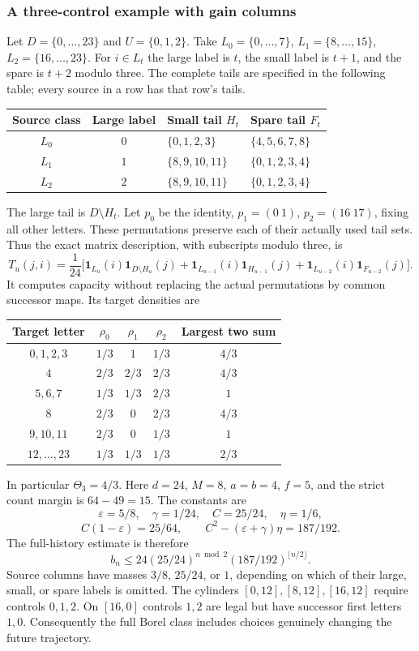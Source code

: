 \documentclass[11pt,reqno]{amsart}
\numberwithin{equation}{section}
\theoremstyle{definition}
\theoremstyle{definition}
\newcommand{\one}{\mathbf 1}
\newcommand{\eps}{\varepsilon}
\begin{document}
\subsubsection{A three-control example with gain columns}
Let $D=\{0,\ldots,23\}$ and $U=\{0,1,2\}$.
Take $L_0=\{0,\ldots,7\}$, $L_1=\{8,\ldots,15\}$,
$L_2=\{16,\ldots,23\}$. For $i\in L_t$ the large label is
$t$, the small label is $t+1$, and the spare is $t+2$ modulo three.
The complete tails are specified in the following table; every
source in a row has that row's tails.
\begin{center}
\begin{tabular}{ccll}
\toprule
Source class&Large label&Small tail $H_t$&Spare tail $F_t$\\
\midrule
$L_0$&$0$&$\{0,1,2,3\}$&$\{4,5,6,7,8\}$\\
$L_1$&$1$&$\{8,9,10,11\}$&$\{0,1,2,3,4\}$\\
$L_2$&$2$&$\{8,9,10,11\}$&$\{0,1,2,3,4\}$\\
\bottomrule
\end{tabular}
\end{center}
The large tail is $D\setminus H_t$. Let $p_0$ be the identity,
$p_1=(0\ 1)$, $p_2=(16\ 17)$, fixing all other letters.
These permutations preserve each of their actually used tail sets.
Thus the exact matrix description, with subscripts modulo three, is
\[
 T_u(j,i)=\frac1{24}\big[
 \one_{L_u}(i)\one_{D\setminus H_u}(j)+
 \one_{L_{u-1}}(i)\one_{H_{u-1}}(j)+
 \one_{L_{u-2}}(i)\one_{F_{u-2}}(j)\big].
\]
It computes capacity without replacing the actual permutations by
common successor maps. Its target densities are
\begin{center}
\begin{tabular}{c|ccc|c}
\toprule
Target letter&$\rho_0$&$\rho_1$&$\rho_2$&Largest two sum\\
\midrule
$0,1,2,3$&$1/3$&$1$&$1/3$&$4/3$\\
$4$&$2/3$&$2/3$&$2/3$&$4/3$\\
$5,6,7$&$1/3$&$1/3$&$2/3$&$1$\\
$8$&$2/3$&$0$&$2/3$&$4/3$\\
$9,10,11$&$2/3$&$0$&$1/3$&$1$\\
$12,\ldots,23$&$1/3$&$1/3$&$1/3$&$2/3$\\
\bottomrule
\end{tabular}
\end{center}
In particular $\Theta_3=4/3$. Here $d=24$, $M=8$, $a=b=4$,
$f=5$, and the strict count margin is $64-49=15$.
The constants are
\[
 \eps=5/8,\quad\gamma=1/24,\quad C=25/24,\quad\eta=1/6,
\]
\[
 C(1-\eps)=25/64,\qquad
 C^2-(\eps+\gamma)\eta=187/192.
\]
The full-history estimate is therefore
\begin{equation}\label{eq:gain-example}
 b_n\le24(25/24)^{n\bmod2}(187/192)^{\lfloor n/2\rfloor}.
\end{equation}
Source columns have masses $3/8$, $25/24$, or $1$, depending
on which of their large, small, or spare labels is omitted.
The cylinders $[0,12],[8,12],[16,12]$ require controls
$0,1,2$. On $[16,0]$ controls $1,2$ are legal but have successor
first letters $1,0$. Consequently the full Borel class includes
choices genuinely changing the future trajectory.
\end{document}
